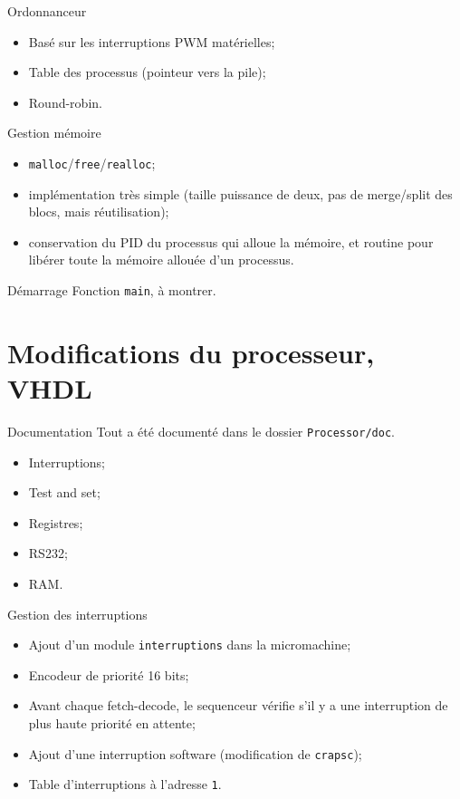 \documentclass{beamer}
\begin{document}
    \begin{frame}[fragile]{Ordonnanceur}
      \begin{itemize}
        \item Basé sur les interruptions PWM matérielles;
        \item Table des processus (pointeur vers la pile);
        \item Round-robin.
      \end{itemize}
\end{frame}

    \begin{frame}[fragile]{Gestion mémoire}
      \begin{itemize}
        \item \verb+malloc+/\verb+free+/\verb+realloc+;
        \item implémentation très simple (taille puissance de deux, pas de
          merge/split des blocs, mais réutilisation);
        \item conservation du PID du processus qui alloue la mémoire, et routine
          pour libérer toute la mémoire allouée d'un processus.
      \end{itemize}
\end{frame}

    \begin{frame}[fragile]{Démarrage}
      Fonction \verb+main+, à montrer.
\end{frame}

  \section{Modifications du processeur, VHDL}
    \begin{frame}[fragile]{Documentation}
      Tout a été documenté dans le dossier \verb+Processor/doc+.
      \begin{itemize}
        \item Interruptions;
        \item Test and set;
        \item Registres;
        \item RS232;
        \item RAM.
      \end{itemize}
\end{frame}

    \begin{frame}[fragile]{Gestion des interruptions}
      \begin{itemize}
        \item Ajout d'un module \verb+interruptions+ dans la micromachine;
        \item Encodeur de priorité 16 bits;
        \item Avant chaque fetch-decode, le sequenceur vérifie s'il y a une
          interruption de plus haute priorité en attente;
        \item Ajout d'une interruption software (modification de \verb+crapsc+);
        \item Table d'interruptions à l'adresse \verb+1+.
      \end{itemize}
\end{frame}
\end{document}
